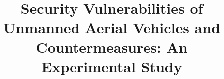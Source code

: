 \documentclass[conference]{IEEEtran}
\begin{document}
%
\title{Security Vulnerabilities of Unmanned Aerial Vehicles and Countermeasures: An Experimental Study}




% 
\end{document}
